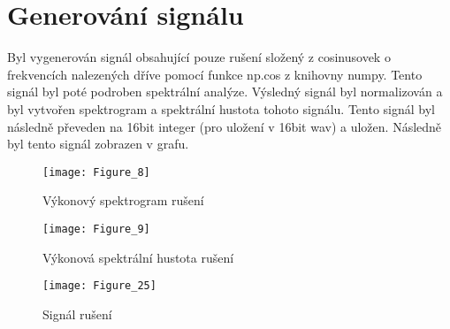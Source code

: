 \section{Generování signálu}

Byl vygenerován signál obsahující pouze rušení složený z cosinusovek o frekvencích nalezených dříve pomocí funkce np.cos z knihovny numpy. Tento signál byl poté podroben spektrální analýze.
Výsledný signál byl normalizován a byl vytvořen spektrogram a spektrální hustota tohoto signálu.
Tento signál byl následně převeden na 16bit integer (pro uložení v 16bit wav) a uložen. Následně byl tento signál zobrazen v grafu.

\begin{figure}[H] 
	\centering
	\texttt{[image: Figure\_8]}
	\caption{Výkonový spektrogram rušení}
\end{figure}

\begin{figure}[H] 
	\centering
	\texttt{[image: Figure\_9]}
	\caption{Výkonová spektrální hustota rušení}
\end{figure}

\begin{landscape}
\begin{figure}[H] 
	\centering
	\texttt{[image: Figure\_25]}
	\caption{Signál rušení}
\end{figure}
\end{landscape}